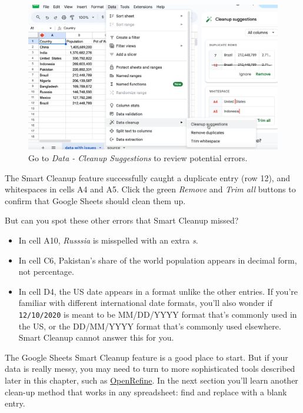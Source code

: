 \documentclass[
  english,
]{book}
\providecommand{\tightlist}{%
  \setlength{\itemsep}{0pt}\setlength{\parskip}{0pt}}
\begin{document}
\begin{figure}
\includegraphics[width=650px]{images/04-clean/sheets-cleanup-suggestions} \caption{Go to \emph{Data - Cleanup Suggestions} to review potential errors.}\label{fig:sheets-cleanup-suggestions}
\end{figure}

The Smart Cleanup feature successfully caught a duplicate entry (row 12), and whitespaces in cells A4 and A5. Click the green \emph{Remove} and \emph{Trim all} buttons to confirm that Google Sheets should clean them up.

But can you spot these other errors that Smart Cleanup missed?

\begin{itemize}
\tightlist
\item
  In cell A10, \emph{Russsia} is misspelled with an extra \emph{s}.
\item
  In cell C6, Pakistan's share of the world population appears in decimal form, not percentage.
\item
  In cell D4, the US date appears in a format unlike the other entries. If you're familiar with different international date formats, you'll also wonder if \texttt{12/10/2020} is meant to be MM/DD/YYYY format that's commonly used in the US, or the DD/MM/YYYY format that's commonly used elsewhere. Smart Cleanup cannot answer this for you.
\end{itemize}

The Google Sheets Smart Cleanup feature is a good place to start. But if your data is really messy, you may need to turn to more sophisticated tools described later in this chapter, such as \href{open-refine.html}{OpenRefine}. In the next section you'll learn another clean-up method that works in any spreadsheet: find and replace with a blank entry.
\end{document}
